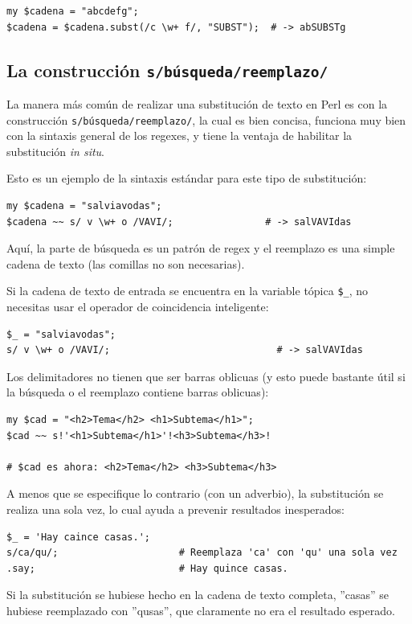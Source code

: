 \begin{lstlisting}
my $cadena = "abcdefg";
$cadena = $cadena.subst(/c \w+ f/, "SUBST");  # -> abSUBSTg
\end{lstlisting}

\subsection{La construcción {\tt s/búsqueda/reemplazo/}}

La manera más común de realizar una substitución de texto en Perl
es con la construcción \verb|s/búsqueda/reemplazo/|, la cual es
bien concisa, funciona muy bien con la sintaxis general de los regexes,
y tiene la ventaja de habilitar la substitución \emph{in situ}.

Esto es un ejemplo de la sintaxis estándar para este tipo de
substitución:

\begin{lstlisting}
my $cadena = "salviavodas";
$cadena ~~ s/ v \w+ o /VAVI/;                # -> salVAVIdas
\end{lstlisting}

Aquí, la parte de búsqueda es un patrón de regex y el reemplazo
es una simple cadena de texto (las comillas no son necesarias).

Si la cadena de texto de entrada se encuentra en la variable tópica
\verb|$_|, no necesitas usar el operador de coincidencia inteligente:

\begin{lstlisting}
$_ = "salviavodas";
s/ v \w+ o /VAVI/;                             # -> salVAVIdas
\end{lstlisting}
%

Los delimitadores no tienen que ser barras oblicuas (y esto puede 
bastante útil si la búsqueda o el reemplazo contiene barras oblicuas):

\begin{lstlisting}
my $cad = "<h2>Tema</h2> <h1>Subtema</h1>";
$cad ~~ s!'<h1>Subtema</h1>'!<h3>Subtema</h3>! 

# $cad es ahora: <h2>Tema</h2> <h3>Subtema</h3>
\end{lstlisting}
%


A menos que se especifique lo contrario (con un adverbio), la
substitución se realiza una sola vez, lo cual ayuda a prevenir
resultados inesperados:

\begin{lstlisting}
$_ = 'Hay caince casas.';
s/ca/qu/;                     # Reemplaza 'ca' con 'qu' una sola vez
.say;                         # Hay quince casas.
\end{lstlisting}
%
Si la substitución se hubiese hecho en la cadena de texto completa,
''casas'' se hubiese reemplazado con ''qusas'', que claramente
no era el resultado esperado.

